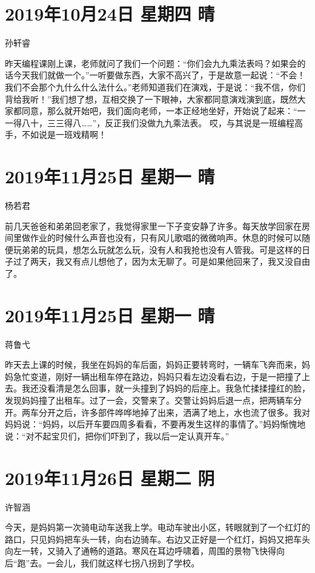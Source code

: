 \section{2019年10月24日 星期四 晴}

孙轩睿

昨天编程课刚上课，老师就问了我们一个问题：``你们会九九乘法表吗？如果会的话今天我们就做一个。''一听要做东西，大家不高兴了，于是故意一起说：``不会！我们不会那个九什么什么法什么。''老师知道我们在演戏，于是说：``我不信，你们背给我听！''我们想了想，互相交换了一下眼神，大家都同意演戏演到底，既然大家都同意，那么就开始吧，我们面向老师，一本正经地坐好，开始说了起来：``一一得八十，三三得八\ldots\ldots{}''，反正我们没做九九乘法表。
哎，与其说是一班编程高手，不如说是一班戏精啊！

\section{2019年11月25日 星期一 晴}

杨若君

前几天爸爸和弟弟回老家了，我觉得家里一下子变安静了许多。每天放学回家在房间里做作业的时候什么声音也没有，只有风儿歌唱的微微响声。休息的时候可以随便玩弟弟的玩具，想怎么玩就怎么玩，没有人和我抢也没有人管我。可是这样的日子过了两天，我又有点儿想他了，因为太无聊了。可是如果他回来了，我又没自由了。

\section{2019年11月25日 星期一 晴}

蒋鲁弋

昨天去上课的时候，我坐在妈妈的车后面，妈妈正要转弯时，一辆车飞奔而来，妈妈急忙变道，刚好一辆出租车停在路边，妈妈只看左边没看右边，于是一把撞了上去。我还没看清是怎么回事，就一头撞到了妈妈的后座上。我急忙揉揉撞红的脸，发现妈妈撞了出租车。过了一会，交警来了。交警让妈妈后退一点，把两辆车分开。两车分开之后，许多部件哗哗地掉了出来，洒满了地上，水也流了很多。我对妈妈说：``妈妈，以后开车要四周多看看，不要再发生这样的事情了。''妈妈惭愧地说：``对不起宝贝们，把你们吓到了，我以后一定认真开车。''

\section{2019年11月26日 星期二 阴}

许智涵

今天，是妈妈第一次骑电动车送我上学。电动车驶出小区，转眼就到了一个红灯的路口，只见妈妈把车头一转，向右边骑车。右边又正好是一个红灯，妈妈又把车头向左一转，又骑入了通畅的道路。寒风在耳边呼啸着，周围的景物飞快得向后``跑''去。一会儿，我们就这样七拐八拐到了学校。

